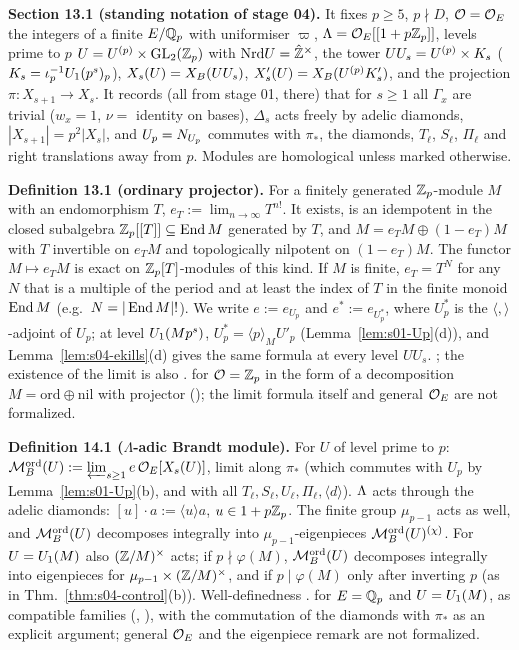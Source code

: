\noindent{}\label{rpt:ss:s04-notation}\textbf{Section 13.1 (standing notation of stage 04).}
It fixes $p\ge5$, $p\nmid D$, $\mathcal{O}=\mathcal{O}_E$ the integers of a finite $E/\mathbb{Q}_p$ with uniformiser $\varpi$, $\Lambda=\mathcal{O}_E[[1+p\mathbb{Z}_p]]$, levels prime
to $p$ $U=U^{(p)}\times\mathrm{GL}_2(\mathbb{Z}_p)$ with $\mathrm{Nrd} U=\hat{\mathbb{Z}}^\times$, the tower $UU_s=U^{(p)}\times K_{s}$ ($K_{s}=\iota_p^{-1}U_1(p^s)_p$),
$X_s(U)=X_B(UU_s)$, $X'_s(U)=X_B(U^{(p)}K'_{s})$, and the projection $\pi:X_{s+1}\to X_s$. It records (all from stage 01, \stproved{}
there) that for $s\ge1$ all $\Gamma_x$ are trivial ($w_x=1$, $\nu=$ identity on bases), $\Delta_s$ acts freely by adelic diamonds,
$|X_{s+1}|=p^2|X_s|$, and $U_p=N_{U_p}$ commutes with $\pi_*$, the diamonds, $T_\ell$, $S_\ell$, $\Pi_\ell$ and right translations away from
$p$. Modules are homological unless marked otherwise.

\medskip
\noindent{}\label{rpt:def:s04-e}\textbf{Definition 13.1 (ordinary projector).}
For a finitely generated $\mathbb{Z}_p$-module $M$ with an endomorphism $T$, $e_T:=\lim_{n\to\infty}T^{n!}$. It exists, is an idempotent
in the closed subalgebra $\mathbb{Z}_p[[T]]\subseteq\operatorname{End} M$ generated by $T$, and $M=e_TM\oplus(1-e_T)M$ with $T$ invertible on $e_TM$ and
topologically nilpotent on $(1-e_T)M$. The functor $M\mapsto e_TM$ is exact on $\mathbb{Z}_p[T]$-modules of this kind. If $M$ is finite,
$e_T=T^{N}$ for any $N$ that is a multiple of the period and at least the index of $T$ in the finite monoid $\operatorname{End} M$
(e.g.\ $N=|\operatorname{End} M|!$). We write $e:=e_{U_p}$ and $e^*:=e_{U_p^*}$, where $U_p^*$ is the $\langle,\rangle$-adjoint of $U_p$; at level
$U_1(Mp^s)$, $U_p^*=\langle p\rangle_MU'_p$ (Lemma~\ref{lem:s01-Up}(d)), and Lemma~\ref{lem:s04-ekills}(d) gives the same formula at
every level $UU_s$.
\stproved{}; the existence of the limit is also \stknown{} \cite[\S7.2, Lemma~1, p.~201]{Hi93}. \stformal{} for $\mathcal{O}=\mathbb{Z}_p$ in the form of a
decomposition $M=\mathrm{ord}\oplus\mathrm{nil}$ with projector (); the limit formula itself and
general $\mathcal{O}_E$ are not formalized.

\medskip
\noindent{}\label{rpt:def:s04-Mord}\textbf{Definition 14.1 ($\Lambda$-adic Brandt module).}
For $U$ of level prime to $p$: $\mathcal{M}^{\mathrm{ord}}_B(U):=\varprojlim_{s\ge1}e\,\mathcal{O}_E[X_s(U)]$, limit along $\pi_*$ (which commutes with $U_p$ by
Lemma~\ref{lem:s01-Up}(b), and with all $T_\ell,S_\ell,U_\ell,\Pi_\ell,\langle d\rangle$). $\Lambda$ acts through the adelic diamonds:
$[u]\cdot a:=\langle u\rangle a$, $u\in1+p\mathbb{Z}_p$. The finite group $\mu_{p-1}$ acts as well, and $\mathcal{M}^{\mathrm{ord}}_B(U)$ decomposes integrally into
$\mu_{p-1}$-eigenpieces $\mathcal{M}^{\mathrm{ord}}_B(U)^{(\chi)}$. For $U=U_1(M)$ also $(\mathbb{Z}/M)^\times$ acts; if $p\nmid\varphi(M)$, $\mathcal{M}^{\mathrm{ord}}_B(U)$ decomposes
integrally into eigenpieces for $\mu_{p-1}\times(\mathbb{Z}/M)^\times$, and if $p\mid\varphi(M)$ only after inverting $p$ (as in
Thm.~\ref{thm:s04-control}(b)).
Well-definedness \stproved. \stformal{} for $E=\mathbb{Q}_p$ and $U=U_1(M)$, as compatible families (,
), with the commutation of the diamonds with $\pi_*$ as an explicit argument; general $\mathcal{O}_E$
and the eigenpiece remark are not formalized.

